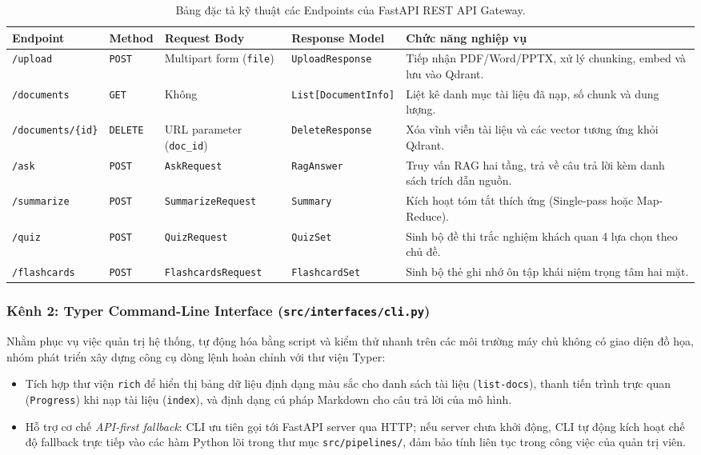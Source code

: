 ﻿\documentclass[12pt]{article}
\begin{document}
\begin{table}[H]
\centering
\small
\begin{tabularx}{\linewidth}{@{}l l p{3.2cm} p{2.6cm} X@{}}
\toprule
\textbf{Endpoint} & \textbf{Method} & \textbf{Request Body} & \textbf{Response Model} & \textbf{Chức năng nghiệp vụ} \\
\midrule
\texttt{/upload} & \texttt{POST} & Multipart form (\texttt{file}) & \texttt{UploadResponse} & Tiếp nhận PDF/Word/PPTX, xử lý chunking, embed và lưu vào Qdrant. \\
\addlinespace[3pt]
\texttt{/documents} & \texttt{GET} & Không & \texttt{List[DocumentInfo]} & Liệt kê danh mục tài liệu đã nạp, số chunk và dung lượng. \\
\addlinespace[3pt]
\texttt{/documents/\{id\}} & \texttt{DELETE} & URL parameter (\texttt{doc\_id}) & \texttt{DeleteResponse} & Xóa vĩnh viễn tài liệu và các vector tương ứng khỏi Qdrant. \\
\addlinespace[3pt]
\texttt{/ask} & \texttt{POST} & \texttt{AskRequest} & \texttt{RagAnswer} & Truy vấn RAG hai tầng, trả về câu trả lời kèm danh sách trích dẫn nguồn. \\
\addlinespace[3pt]
\texttt{/summarize} & \texttt{POST} & \texttt{SummarizeRequest} & \texttt{Summary} & Kích hoạt tóm tắt thích ứng (Single-pass hoặc Map-Reduce). \\
\addlinespace[3pt]
\texttt{/quiz} & \texttt{POST} & \texttt{QuizRequest} & \texttt{QuizSet} & Sinh bộ đề thi trắc nghiệm khách quan 4 lựa chọn theo chủ đề. \\
\addlinespace[3pt]
\texttt{/flashcards} & \texttt{POST} & \texttt{FlashcardsRequest} & \texttt{FlashcardSet} & Sinh bộ thẻ ghi nhớ ôn tập khái niệm trọng tâm hai mặt. \\
\bottomrule
\end{tabularx}
\caption{Bảng đặc tả kỹ thuật các Endpoints của FastAPI REST API Gateway.}
\end{table}

\subsubsection{Kênh 2: Typer Command-Line Interface (\texttt{src/interfaces/cli.py})}
Nhằm phục vụ việc quản trị hệ thống, tự động hóa bằng script và kiểm thử nhanh trên các môi trường máy chủ không có giao diện đồ họa, nhóm phát triển xây dựng công cụ dòng lệnh hoàn chỉnh với thư viện Typer:
\begin{itemize}
    \item Tích hợp thư viện \texttt{rich} để hiển thị bảng dữ liệu định dạng màu sắc cho danh sách tài liệu (\texttt{list-docs}), thanh tiến trình trực quan (\texttt{Progress}) khi nạp tài liệu (\texttt{index}), và định dạng cú pháp Markdown cho câu trả lời của mô hình.
    \item Hỗ trợ cơ chế \textit{API-first fallback}: CLI ưu tiên gọi tới FastAPI server qua HTTP; nếu server chưa khởi động, CLI tự động kích hoạt chế độ fallback trực tiếp vào các hàm Python lõi trong thư mục \texttt{src/pipelines/}, đảm bảo tính liên tục trong công việc của quản trị viên.
\end{itemize}
\end{document}
